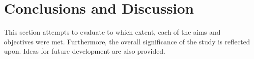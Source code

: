\documentclass[11pt,english]{article}
\begin{document}
























\newpage

\section{Conclusions and Discussion}
\paragraph{}
This section attempts to evaluate to which extent, each of the aims and objectives were met. Furthermore, the overall significance of the study is reflected upon. Ideas for future development are also provided. 
\end{document}
